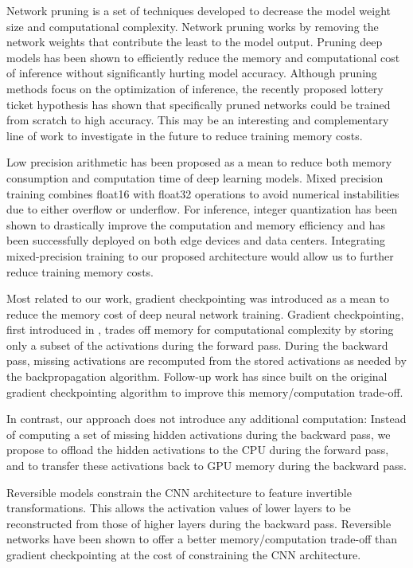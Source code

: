 \documentclass[11pt,onecolumn]{article}
\begin{document}
Network pruning \cite{molchanov2016pruning} is a set of techniques 
developed to decrease the model weight size and computational complexity.
Network pruning works by removing the network weights that contribute the least to the model output.
Pruning deep models has been shown to efficiently reduce the memory 
and computational cost of inference without  significantly hurting model accuracy.
Although pruning methods focus on the optimization of inference, 
the recently proposed lottery ticket hypothesis \cite{frankle2018lottery} 
has shown that specifically pruned networks could  be trained from scratch to high accuracy.
This may be an interesting and complementary line of work to investigate in the future to reduce training memory costs.

Low precision arithmetic has been proposed as a mean to reduce 
both memory consumption and computation time of deep learning models.
Mixed precision training \cite{micikevicius2017mixed} combines float16 with float32 operations
to avoid numerical instabilities due to either overflow or underflow.
For inference,  integer quantization \cite{jacob2018quantization,wu2018training} 
has been shown to drastically improve the computation and memory efficiency 
and has been successfully deployed on both edge devices and data centers.
Integrating mixed-precision training to our proposed architecture would allow 
us to further reduce training memory costs. 

Most related to our work, gradient checkpointing was introduced as a mean 
to reduce the memory cost of deep neural network training.
Gradient checkpointing, first introduced in \cite{martens2012training}, 
trades off memory for computational complexity by storing only a subset 
of the activations during the forward pass.
During the backward pass, missing activations are recomputed from 
the stored activations as needed by the backpropagation algorithm.
Follow-up work \cite{chen2016training} has since built on the original gradient 
checkpointing algorithm to improve this memory/computation trade-off.  

In contrast, our approach does not introduce any additional computation:
Instead of computing a set of missing hidden activations during the backward pass,
we propose to offload the hidden activations to the CPU during the forward pass,
and to transfer these activations back to GPU memory during the backward pass.

Reversible models \cite{gomez2017reversible,jacobsen2018revnet} constrain the CNN architecture to feature invertible transformations.
This allows the activation values of lower layers to be reconstructed from those of higher layers during
the backward pass. 
Reversible networks have been shown to offer a better memory/computation trade-off than 
gradient checkpointing at the cost of constraining the CNN architecture.
\end{document}
